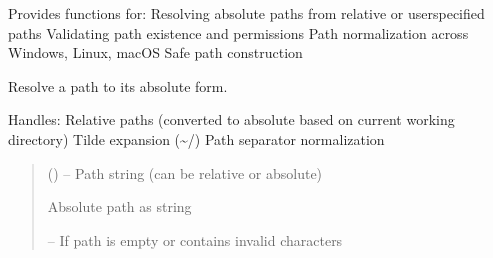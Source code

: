 \documentclass[a4paper,11pt,english,openany,oneside]{sphinxmanual}
\begin{document}
\sphinxAtStartPar
Provides functions for:
\sphinxhyphen{} Resolving absolute paths from relative or user\sphinxhyphen{}specified paths
\sphinxhyphen{} Validating path existence and permissions
\sphinxhyphen{} Path normalization across Windows, Linux, macOS
\sphinxhyphen{} Safe path construction

\begin{fulllineitems}
\label{\detokenize{modules/core:core.path_utils.resolve_absolute_path}}
\pysigstartsignatures
\pysiglinewithargsret
{}
{}
{}
\pysigstopsignatures
\sphinxAtStartPar
Resolve a path to its absolute form.

\sphinxAtStartPar
Handles:
\sphinxhyphen{} Relative paths (converted to absolute based on current working directory)
\sphinxhyphen{} Tilde expansion (\textasciitilde{}/)
\sphinxhyphen{} Path separator normalization
\begin{quote}\begin{description}
\sphinxAtStartPar
{} () – Path string (can be relative or absolute)

\sphinxAtStartPar
Absolute path as string

\sphinxAtStartPar
{} – If path is empty or contains invalid characters

\sphinxAtStartPar
{}

\end{description}\end{quote}

\end{fulllineitems}

\end{document}
